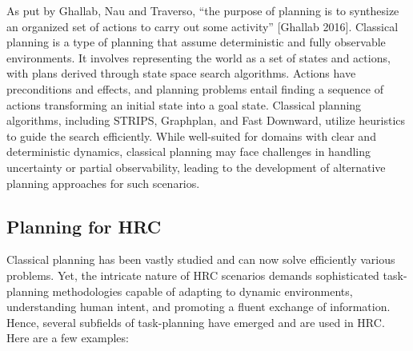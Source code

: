 As put by Ghallab, Nau and Traverso, “the purpose of planning is to synthesize an organized set of actions to carry out some activity” [Ghallab 2016]. 
Classical planning is a type of planning that assume deterministic and fully observable environments. It involves representing the world as a set of states and actions, with plans derived through state space search algorithms. Actions have preconditions and effects, and planning problems entail finding a sequence of actions transforming an initial state into a goal state. Classical planning algorithms, including STRIPS, Graphplan, and Fast Downward, utilize heuristics to guide the search efficiently. While well-suited for domains with clear and deterministic dynamics, classical planning may face challenges in handling uncertainty or partial observability, leading to the development of alternative planning approaches for such scenarios.

\subsection{Planning for HRC}

Classical planning has been vastly studied and can now solve efficiently various problems. Yet, the intricate nature of HRC scenarios demands sophisticated task-planning methodologies capable of adapting to dynamic environments, understanding human intent, and promoting a fluent exchange of information. Hence, several subfields of task-planning have emerged and are used in HRC. Here are a few examples:

